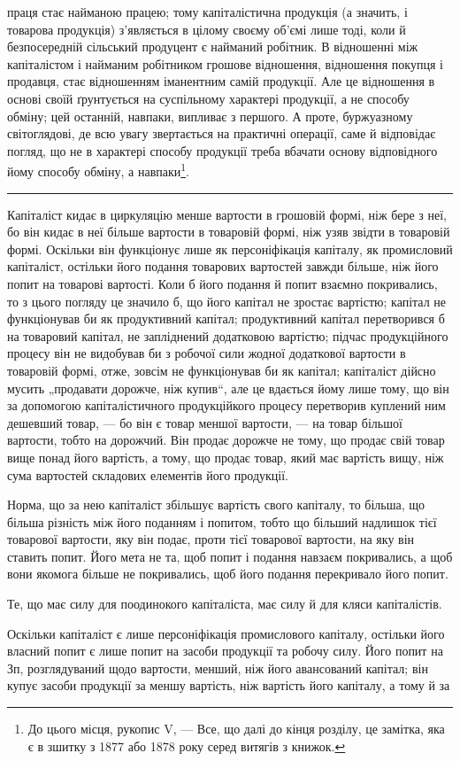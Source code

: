 \parcont{}  %
праця стає найманою працею; тому капіталістична продукція (а значить,
і товарова продукція) з’являється в цілому своєму об’ємі лише тоді,
коли й безпосередній сільський продуцент є найманий робітник. В відношенні
між капіталістом і найманим робітником грошове відношення, відношення покупця і продавця, стає
відношенням іманентним самій продукції. Але це відношення в основі своїй ґрунтується на суспільному
характері продукції, а не способу обміну; цей останній, навпаки, випливає з першого.
А проте, буржуазному світоглядові, де всю увагу звертається на практичні
операції, саме й відповідає погляд, що не в характері способу продукції
треба вбачати основу відповідного йому способу обміну, а навпаки\footnote{
До цього місця, рукопис V, — Все, що далі до кінця розділу, це замітка, яка є в зшитку з 1877 або
1878 року серед витягів з книжок.
}.

\pfbreak{}

Капіталіст кидає в циркуляцію менше вартости в грошовій формі,
ніж бере з неї, бо він кидає в неї більше вартости в товаровій формі,
ніж узяв звідти в товаровій формі. Оскільки він функціонує лише як персоніфікація
капіталу, як промисловий капіталіст, остільки його подання
товарових вартостей завжди більше, ніж його попит на товарові вартості.
Коли б його подання й попит взаємно покривались, то з цього погляду
це значило б, що його капітал не зростає вартістю; капітал не функціонував
би як продуктивний капітал; продуктивний капітал перетворився б
на товаровий капітал, не запліднений додатковою вартістю; підчас продукційного
процесу він не видобував би з робочої сили жодної додаткової
вартости в товаровій формі, отже, зовсім не функціонував би як
капітал; капіталіст дійсно мусить „продавати дорожче, ніж купив“, але
це вдається йому лише тому, що він за допомогою капіталістичного
продукційкого процесу перетворив куплений ним дешевший товар, — бо він
є товар меншої вартости, — на товар більшої вартости, тобто на дорожчий.
Він продає дорожче не тому, що продає свій товар вище понад його
вартість, а тому, що продає товар, який має вартість вищу, ніж сума
вартостей складових елементів його продукції.

Норма, що за нею капіталіст збільшує вартість свого капіталу, то більша,
що більша різність між його поданням і попитом, тобто що більший
надлишок тієї товарової вартости, яку він подає, проти тієї товарової
вартости, на яку він ставить попит. Його мета не та, щоб попит і
подання навзаєм покривались, а щоб вони якомога більше не покривались,
щоб його подання перекривало його попит.

Те, що має силу для поодинокого капіталіста, має силу й для кляси
капіталістів.

Оскільки капіталіст є лише персоніфікація промислового капіталу,
остільки його власний попит є лише попит на засоби продукції та
робочу силу. Його попит на Зп, розглядуваний щодо вартости,
менший, ніж його авансований капітал; він купує засоби продукції
за меншу вартість, ніж вартість його капіталу, а тому й за
\parbreak{}  %
